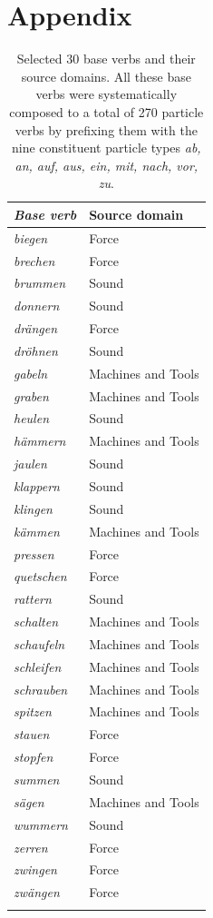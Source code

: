 \documentclass[output=paper]{langsci/langscibook}
\begin{document}
\section*{Appendix}\largerpage[2]
\begin{table}[H]
  \caption{Selected 30 base verbs and their source domains. All these
    base verbs were systematically composed to a total of 270 particle
    verbs by prefixing them with the nine constituent particle types
    \textit{ab, an, auf, aus, ein, mit, nach, vor, zu}.\label{tab:bv-sd}}
  \begin{tabular}{>{\itshape}ll}
    \lsptoprule
    \normalfont Base verb & Source domain \\ \midrule
    biegen & Force \\
    brechen & Force \\
    brummen & Sound \\
    donnern & Sound \\
    drängen & Force \\
    dröhnen & Sound \\
    gabeln & Machines and Tools \\
    graben & Machines and Tools \\
    heulen & Sound \\
    hämmern & Machines and Tools \\
    jaulen & Sound \\
    klappern & Sound \\
    klingen & Sound \\
    kämmen & Machines and Tools \\
    pressen & Force \\
    quetschen & Force \\
    rattern & Sound \\
    schalten & Machines and Tools \\
    schaufeln & Machines and Tools \\
    schleifen & Machines and Tools \\
    schrauben & Machines and Tools \\
    spitzen & Machines and Tools \\
    stauen & Force \\
    stopfen & Force \\
    summen & Sound \\
    sägen & Machines and Tools \\
    wummern & Sound \\
    zerren & Force \\
    zwingen & Force \\
    zwängen & Force \\
    \lspbottomrule
  \end{tabular}
\end{table}
\end{document}
